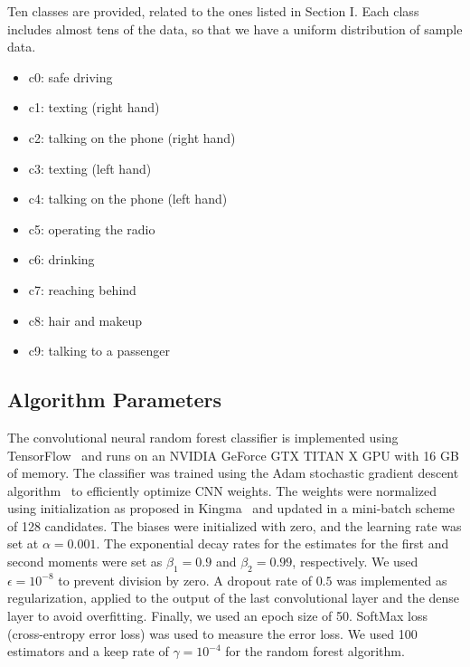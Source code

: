 \documentclass[conference,compsoc]{IEEEtran}
\begin{document}
Ten classes are provided, related to the ones listed in Section I\@. Each class includes almost tens of the data, so that we have a uniform distribution of sample data.

\begin{itemize}
\item c0: safe driving
\item c1: texting (right hand)
\item c2: talking on the phone (right hand)
\item c3: texting (left hand)
\item c4: talking on the phone (left hand)
\item c5: operating the radio
\item c6: drinking
\item c7: reaching behind
\item c8: hair and makeup
\item c9: talking to a passenger
\end{itemize}


\subsection{Algorithm Parameters}
The convolutional neural random forest classifier is implemented using TensorFlow~\cite{abadi_tensorflowlarge_2016} and runs on an NVIDIA GeForce GTX TITAN X GPU with 16 GB of memory. The classifier was trained using the Adam stochastic gradient descent algorithm~\cite{kingma_Adam_2014} to efficiently optimize CNN weights. The weights were normalized using initialization as proposed in Kingma~\cite{kingma_Adam_2014} and updated in a mini-batch scheme of 128 candidates. The biases were initialized with zero, and the learning rate was set at $\alpha = 0.001 $. The exponential decay rates for the estimates for the first and second moments were set as $\beta_1 = 0.9 $ and $\beta_2 = 0.99 $, respectively. We used $\epsilon = {10}^{-8} $ to prevent division by zero. A dropout rate of $0.5 $ was implemented as regularization, applied to the output of the last convolutional layer and the dense layer to avoid overfitting. Finally, we used an epoch size of 50.  SoftMax loss (cross-entropy error loss) was used to measure the error loss. We used 100 estimators and a keep rate of $\gamma = {10}^{-4} $ for the random forest algorithm.
\end{document}

